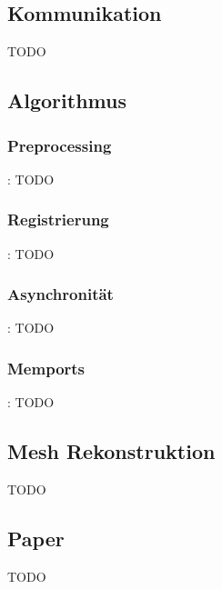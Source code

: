 \documentclass{beamer}
\begin{document}
\subsection{Kommunikation}
\begin{frame}{\subsecname}
TODO
\end{frame}

\subsection{Algorithmus}

\subsubsection*{Preprocessing}
\begin{frame}{\subsecname: \subsubsecname}
TODO
\end{frame}

\subsubsection*{Registrierung}
\begin{frame}{\subsecname: \subsubsecname}
TODO
\end{frame}

\subsubsection*{Asynchronität}
\begin{frame}{\subsecname: \subsubsecname}
TODO
\end{frame}

\subsubsection*{Memports}
\begin{frame}{\subsecname: \subsubsecname}
TODO
\end{frame}

\subsection{Mesh Rekonstruktion}
\begin{frame}{\subsecname}
TODO
\end{frame}

\subsection{Paper}
\begin{frame}{\subsecname}
TODO
\end{frame}
\end{document}
